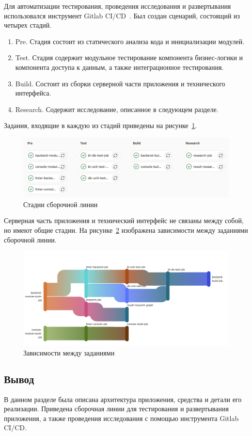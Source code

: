 Для автоматизации тестирования, проведения исследования и развертывания использовался инструмент Gitlab CI/CD~\cite{ci}. Был создан сценарий, состоящий из четырех стадий. 
\begin{enumerate}[label=\arabic*)]
	\item Pre. Стадия состоит из статического анализа кода и инициализации модулей. 
	\item Test. Стадия содержит модульное тестирование компонента бизнес-логики и компонента доступа к данным, а также интеграционное тестирования.
	\item Build. Состоит из сборки серверной части приложения и технического интерфейса.
	\item Research. Содержит исследование, описанное в следующем разделе.
\end{enumerate}
Задания, входящие в каждую из стадий приведены на рисунке~\ref{stages}. 
\begin{figure}[!h]
	\centering
	\includegraphics[width=\textwidth]{image/stages}
	\caption{Стадии сборочной линии}
	\label{stages}
\end{figure}

Серверная часть приложения и технический интерфейс не связаны между собой, но имеют общие стадии. На рисунке~\ref{needs} изображена зависимости между заданиями сборочной линии. 
\begin{figure}[!h]
	\centering
	\includegraphics[width=\textwidth]{image/needs}
	\caption{Зависимости между заданиями}
	\label{needs}
\end{figure}


\subsection*{Вывод}
В данном разделе была описана архитектура приложения, средства и детали его реализации. Приведена сборочная линии для тестирования и развертывания приложения, а также проведения исследования с помощью инструмента Gitlab CI/CD.

